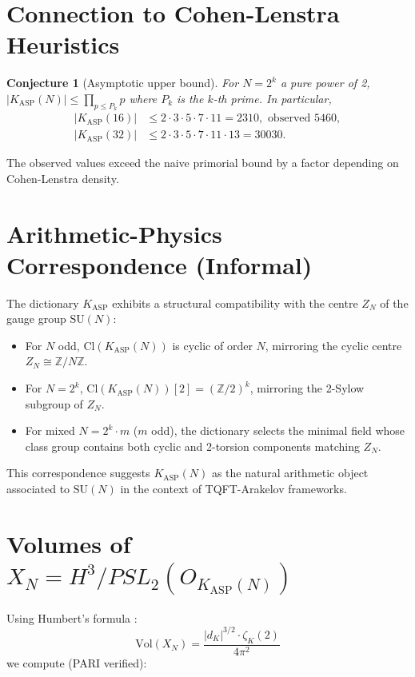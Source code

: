 \documentclass[11pt]{article}
\newtheorem{conjecture}{Conjecture}
\theoremstyle{definition}
\begin{document}
\section{Connection to Cohen-Lenstra Heuristics}

\begin{conjecture}[Asymptotic upper bound]
For $N = 2^k$ a pure power of 2, $|K_{\mathrm{ASP}}(N)| \leq \prod_{p \leq P_k} p$ where $P_k$ is the $k$-th prime. In particular,
\begin{align*}
|K_{\mathrm{ASP}}(16)| &\leq 2 \cdot 3 \cdot 5 \cdot 7 \cdot 11 = 2310, \text{ observed } 5460, \\
|K_{\mathrm{ASP}}(32)| &\leq 2 \cdot 3 \cdot 5 \cdot 7 \cdot 11 \cdot 13 = 30030.
\end{align*}
\end{conjecture}

The observed values exceed the naive primorial bound by a factor depending on Cohen-Lenstra density.

\section{Arithmetic-Physics Correspondence (Informal)}

The dictionary $K_{\mathrm{ASP}}$ exhibits a structural compatibility with the centre $Z_N$ of the gauge group $\mathrm{SU}(N)$:
\begin{itemize}
\item For $N$ odd, $\mathrm{Cl}(K_{\mathrm{ASP}}(N))$ is cyclic of order $N$, mirroring the cyclic centre $Z_N \cong \mathbb{Z}/N\mathbb{Z}$.
\item For $N = 2^k$, $\mathrm{Cl}(K_{\mathrm{ASP}}(N))[2] = (\mathbb{Z}/2)^k$, mirroring the 2-Sylow subgroup of $Z_N$.
\item For mixed $N = 2^k \cdot m$ ($m$ odd), the dictionary selects the minimal field whose class group contains both cyclic and 2-torsion components matching $Z_N$.
\end{itemize}

This correspondence suggests $K_{\mathrm{ASP}}(N)$ as the natural arithmetic object associated to $\mathrm{SU}(N)$ in the context of TQFT-Arakelov frameworks.

\section{Volumes of $X_N = H^3/PSL_2(O_{K_{\mathrm{ASP}}(N)})$}

Using Humbert's formula \cite{Humbert1919}:
\[
\mathrm{Vol}(X_N) = \frac{|d_K|^{3/2} \cdot \zeta_K(2)}{4\pi^2}
\]
we compute (PARI verified):
\end{document}
